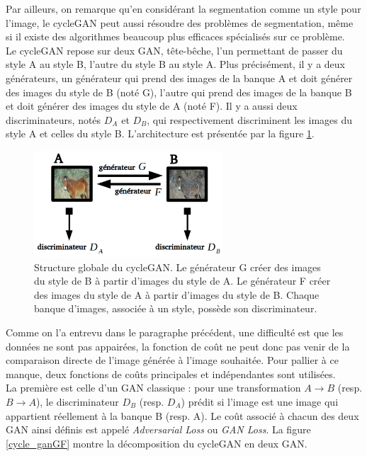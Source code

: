 Par ailleurs, on remarque qu'en considérant la segmentation comme un style pour l'image, le cycleGAN peut aussi résoudre des problèmes de segmentation, même si il existe des algorithmes beaucoup plus efficaces spécialisés sur ce problème.\\

Le cycleGAN repose sur deux GAN, tête-bêche, l'un permettant de passer du style A au style B, l'autre du style B au style A. Plus précisément, il y a deux générateurs, un générateur qui prend des images de la banque A et doit générer des images du style de B (noté G), l'autre qui prend des images de la banque B et doit générer des images du style de A (noté F). Il y a aussi deux discriminateurs, notés $D_A$ et $D_B$, qui respectivement discriminent les images du style A et celles du style B. L'architecture est présentée par la figure \ref{cycleDouble}.

\begin{figure}[!h]
\centering
\includegraphics[width=200pt]{"images/cycle/cycleDouble"}
\caption{Structure globale du cycleGAN. Le générateur G créer des images du style de B à partir d'images du style de A. Le générateur F créer des images du style de A à partir d'images du style de B. Chaque banque d'images, associée à un style, possède son discriminateur.}
\label{cycleDouble}
\end{figure}

Comme on l'a entrevu dans le paragraphe précédent, une difficulté est que les données ne sont pas appairées, la fonction de coût ne peut donc pas venir de la comparaison directe de l'image générée à l'image souhaitée. Pour pallier à ce manque, deux fonctions de coûts principales et indépendantes sont utilisées.\\

La première est celle d'un GAN classique : pour une transformation $ A \rightarrow B $ (resp. $ B \rightarrow A $), le discriminateur $ D_B $ (resp. $ D_A $) prédit si l'image est une image qui appartient réellement à la banque B (resp. A). Le coût associé à chacun des deux GAN ainsi définis est appelé \textit{Adversarial Loss} ou \textit{GAN Loss}. La figure \ref{cycle_ganGF} montre la décomposition du cycleGAN en deux GAN. \\

